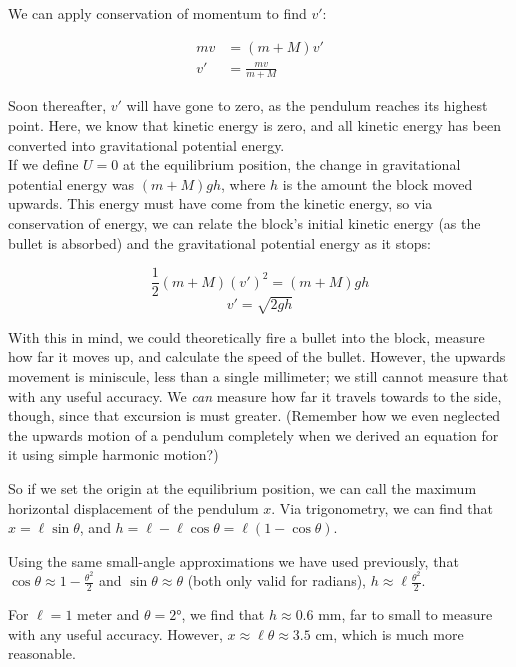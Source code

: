 \documentclass[12pt,a4paper]{report}
\begin{document}
We can apply conservation of momentum to find $v'$:

\begin{align}
m v &= (m + M) v'\\
v' &= \frac	{m v}{m + M}
\end{align}

Soon thereafter, $v'$ will have gone to zero, as the pendulum reaches its highest point. Here, we know that kinetic energy is zero, and all kinetic energy has been converted into gravitational potential energy.\\
If we define $U = 0$ at the equilibrium position, the change in gravitational potential energy was $(m + M) g h$, where $h$ is the amount the block moved upwards. This energy must have come from the kinetic energy, so via conservation of energy, we can relate the block's initial kinetic energy (as the bullet is absorbed) and the gravitational potential energy as it stops:

\begin{equation}
\frac{1}{2} (m + M) (v')^2 = (m + M) g h
\end{equation}
\begin{equation}
v' = \sqrt{2 g h}
\end{equation}

With this in mind, we could theoretically fire a bullet into the block, measure how far it moves up, and calculate the speed of the bullet. However, the upwards movement is miniscule, less than a single millimeter; we still cannot measure that with any useful accuracy. We \emph{can} measure how far it travels towards to the side, though, since that excursion is must greater. (Remember how we even neglected the upwards motion of a pendulum completely when we derived an equation for it using simple harmonic motion?)

So if we set the origin at the equilibrium position, we can call the maximum horizontal displacement of the pendulum $x$. Via trigonometry, we can find that $x = \ell \sin \theta$, and $h = \ell - \ell \cos \theta = \ell(1 - \cos \theta)$.

Using the same small-angle approximations we have used previously, that $\displaystyle \cos \theta \approx 1 - \frac{\theta^2}{2}$ and $\sin \theta \approx \theta$ (both only valid for radians), $\displaystyle h \approx \ell \frac{\theta^2}{2}$.

For $\ell = 1$ meter and $\theta = \ang{2}$, we find that $h \approx 0.6$ mm, far to small to measure with any useful accuracy. However, $x \approx \ell \theta \approx 3.5$ cm, which is much more reasonable. 
\end{document}
